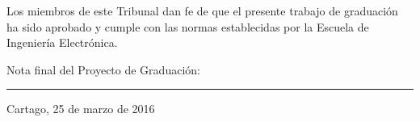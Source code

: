 \vfill

Los miembros de este Tribunal dan fe de que el presente trabajo de graduación
ha sido aprobado y cumple con las normas establecidas por la Escuela de
Ingeniería Electrónica.

\vfill

\begin{center}
  Nota final del Proyecto de Graduación: \rule{3cm}{0.5pt}
\end{center}
\vfill

\begin{center}
  Cartago, 25 de marzo de 2016\par
\end{center}

\cleardoublepage

